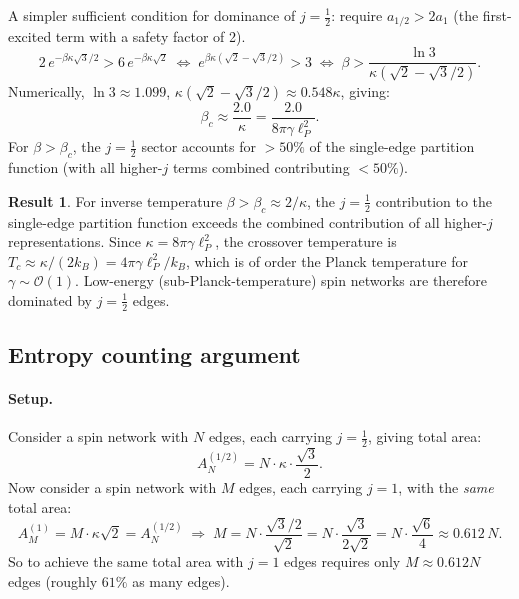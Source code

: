 \documentclass[11pt,a4paper]{article}
\newcommand{\lp}{\ell_P}
\theoremstyle{definition}
\newtheorem{result}{Result}
\begin{document}
A simpler sufficient condition for dominance of $j=\tfrac{1}{2}$:
require $a_{1/2} > 2a_1$ (the first-excited term with a safety factor of 2).
\begin{equation}
  2\,e^{-\beta\kappa\sqrt{3}/2} > 6\,e^{-\beta\kappa\sqrt{2}}
  \;\Longleftrightarrow\;
  e^{\beta\kappa(\sqrt{2}-\sqrt{3}/2)} > 3
  \;\Longleftrightarrow\;
  \beta > \frac{\ln 3}{\kappa(\sqrt{2}-\sqrt{3}/2)}.
\end{equation}
Numerically, $\ln 3\approx 1.099$, $\kappa(\sqrt{2}-\sqrt{3}/2)\approx 0.548\kappa$,
giving:
\begin{equation}\label{eqn:beta-critical}
  \boxed{
  \beta_c \approx \frac{2.0}{\kappa}
  = \frac{2.0}{8\pi\gamma\lp^2}.
  }
\end{equation}
For $\beta > \beta_c$, the $j=\tfrac{1}{2}$ sector accounts for $>50\%$ of
the single-edge partition function (with all higher-$j$ terms combined
contributing $<50\%$).

\begin{result}\label{res:dominance}
  For inverse temperature $\beta > \beta_c \approx 2/\kappa$, the
  $j=\tfrac{1}{2}$ contribution to the single-edge partition function
  exceeds the combined contribution of all higher-$j$ representations.
  Since $\kappa = 8\pi\gamma\lp^2$, the crossover temperature is
  $T_c \approx \kappa/(2k_B) = 4\pi\gamma\lp^2/k_B$, which is of order
  the Planck temperature for $\gamma\sim\mathcal{O}(1)$.  Low-energy
  (sub-Planck-temperature) spin networks are therefore dominated by
  $j=\tfrac{1}{2}$ edges.
\end{result}

\subsection{Entropy counting argument}
\label{sub:entropy}

\paragraph{Setup.}
Consider a spin network with $N$ edges, each carrying $j=\tfrac{1}{2}$,
giving total area:
\begin{equation}
  A_{N}^{(1/2)} = N\cdot\kappa\cdot\frac{\sqrt{3}}{2}.
\end{equation}
Now consider a spin network with $M$ edges, each carrying $j=1$, with the
\emph{same} total area:
\begin{equation}
  A_{M}^{(1)} = M\cdot\kappa\sqrt{2} = A_{N}^{(1/2)}
  \;\Longrightarrow\;
  M = N\cdot\frac{\sqrt{3}/2}{\sqrt{2}} = N\cdot\frac{\sqrt{3}}{2\sqrt{2}}
  = N\cdot\frac{\sqrt{6}}{4}\approx 0.612\,N.
\end{equation}
So to achieve the same total area with $j=1$ edges requires only $M\approx 0.612N$
edges (roughly $61\%$ as many edges).
\end{document}
